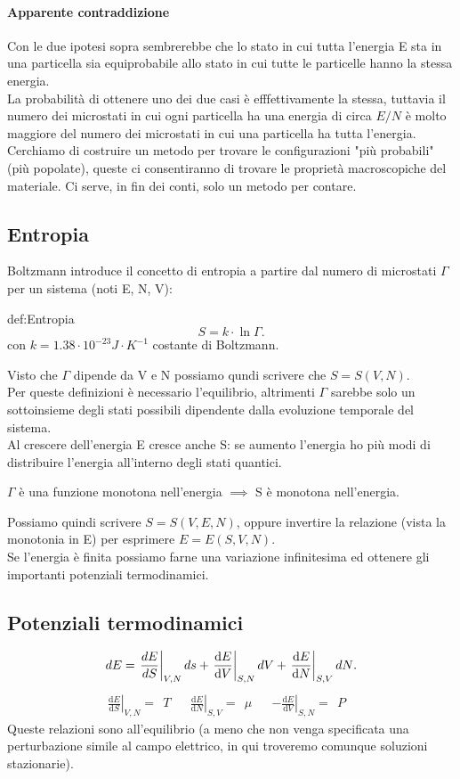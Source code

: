 \paragraph{Apparente contraddizione} %
Con le due ipotesi sopra sembrerebbe che lo stato in cui tutta l'energia E sta in una particella sia equiprobabile allo stato in cui tutte le particelle hanno la stessa energia. \\
La probabilità di ottenere uno dei due casi è efffettivamente la stessa, tuttavia il numero dei microstati in cui ogni particella ha una energia di circa $E / N$ è molto maggiore del numero dei microstati in cui una particella ha tutta l'energia.\\
Cerchiamo di costruire un metodo per trovare le configurazioni "più probabili" (più popolate), queste ci consentiranno di trovare le proprietà macroscopiche del materiale. Ci serve, in fin dei conti, solo un metodo per contare. 
\subsection{Entropia}%
Boltzmann introduce il concetto di entropia a partire dal numero di microstati $\Gamma$ per un sistema (noti E, N, V):
\begin{defn}[Entropia]{def:Entropia}
	\[
	S = k\cdot \ln\Gamma
	.\] 
	con $k = 1.38 \cdot 10^{-23} J\cdot K^{-1}$ costante di Boltzmann.\\
\end{defn}
Visto che $\Gamma$ dipende da V e N possiamo qundi scrivere che $S = S\left( V, N \right)$. \\
Per queste definizioni è necessario l'equilibrio, altrimenti $\Gamma$ sarebbe solo un sottoinsieme degli stati possibili dipendente dalla evoluzione temporale del sistema.\\
Al crescere dell'energia E cresce anche S: se aumento l'energia ho più modi di distribuire l'energia all'interno degli stati quantici. 
\begin{center}
$\Gamma$ è una funzione monotona nell'energia $\implies$ S è monotona nell'energia.
\end{center}
Possiamo quindi scrivere $S = S(V,E,N)$, oppure invertire la relazione (vista la monotonia in E) per esprimere $E = E(S,V,N)$.\\ 
Se l'energia è finita possiamo farne una variazione infinitesima ed ottenere gli importanti potenziali termodinamici.
\subsection{Potenziali termodinamici}%
\[
	dE = \left.\frac{dE}{dS}\right|_{V,N}ds + \left.\frac{\mbox{d} E}{\mbox{d} V} \right|_{S,N}dV + \left.\frac{\mbox{d} E}{\mbox{d} N} \right|_{S,V}dN\\
.\]
\begin{align}
	\left.\frac{\mbox{d} E}{\mbox{d} S}\right|_{V,N}= \ \ T&
	&\left.\frac{\mbox{d} E}{\mbox{d} N}\right|_{S,V} = \ \ \mu& 
	&\left.-\frac{\mbox{d} E}{\mbox{d} V} \right|_{S,N} = \ \ P&
\end{align}
Queste relazioni sono all'equilibrio (a meno che non venga specificata una perturbazione simile al campo elettrico, in qui troveremo comunque soluzioni stazionarie).
